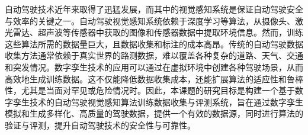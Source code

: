 \begin{abstractzh}


自动驾驶技术近年来取得了迅猛发展，而其中的视觉感知系统是保证自动驾驶安全与效率的关键之一。自动驾驶视觉感知系统依赖于深度学习等算法，从摄像头、激光雷达、超声波等传感器中获取的图像和传感器数据中提取环境信息。然而，训练这些算法所需的数据量巨大，且数据收集和标注的成本高昂。传统的自动驾驶数据收集方法通常依赖于真实世界的路测数据，难以覆盖各种复杂的道路、天气、交通和突发情况。数字孪生技术的应用可以通过在虚拟环境中创建各种驾驶场景，从而高效地生成训练数据。这不仅能降低数据收集成本，还能扩展算法的适应性和鲁棒性，尤其是当面对罕见或危险情况时。因此，本课题的研究目标是构建一个基于数字孪生技术的自动驾驶视觉感知算法训练数据收集与评测系统，旨在通过数字孪生模拟和生成多样化、高质量的驾驶数据，提供一个有效的数据源，同时进行算法的验证与评测，提升自动驾驶技术的安全性与可靠性。


\end{abstractzh}